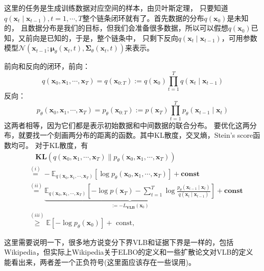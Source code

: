 这里的任务是生成训练数据对应空间的样本，由贝叶斯定理，
只要知道$q(\mathbf{x}_t \mid \mathbf{x}_{t-1}), t=1,\cdots, T$整个链条闭环就有了。首先数据的分布$q(\mathbf{x}_0)$是未知的，
且数据分布是我们的目标，但我们会准备很多数据，所以可以假想$q(\mathbf{x}_0)$已知，又前向是已知的，于是，整个链条中，
只剩下反向$q(\mathbf{x}_t \mid \mathbf{x}_{t-1})$，可用参数模型$\mathcal{N}\left(\mathbf{x}_{t-1} ;
 \boldsymbol{\mu}_\theta\left(\mathbf{x}_t, t\right), \boldsymbol{\Sigma}_\theta\left(\mathbf{x}_t, t\right)\right)$来表示。

前向和反向的闭环，前向：
\begin{equation}
q\left(\mathbf{x}_0, \mathbf{x}_1, \cdots, \mathbf{x}_T\right)=q(\mathbf{x}_{0:T}):=q\left(\mathbf{x}_0\right) \prod_{t=1}^T q\left(\mathbf{x}_t \mid \mathbf{x}_{t-1}\right)
\end{equation}
反向：
\begin{equation}
p_\theta\left(\mathbf{x}_0, \mathbf{x}_1, \cdots, \mathbf{x}_T\right)=p_\theta(\mathbf{x}_{0:T}):=p\left(\mathbf{x}_T\right) \prod_{t=1}^T p_\theta\left(\mathbf{x}_{t-1} \mid \mathbf{x}_t\right)
\end{equation}
这两者相等，因为它们都是表示初始数据和中间数据的联合分布。
要优化这两分布，就要找一个刻画两分布的距离的函数。其中KL散度，交叉熵，Stein's score函数均可。
对于KL散度，有
\begin{equation}
\begin{aligned}
& \quad \mathbf{KL}\left(q\left(\mathbf{x}_0, \mathbf{x}_1, \cdots, \mathbf{x}_T\right) \| p_\theta\left(\mathbf{x}_0, \mathbf{x}_1, \cdots, \mathbf{x}_T\right)\right) \\
& \stackrel{(i)}{=}-\mathbb{E}_{q\left(\mathbf{x}_0, \mathbf{x}_1, \cdots, \mathbf{x}_T\right)}\left[\log p_\theta\left(\mathbf{x}_0, \mathbf{x}_1, \cdots, \mathbf{x}_T\right)\right]+\mathbf{const} \\
& \stackrel{(i i)}{=} \underbrace{\mathbb{E}_{q\left(\mathbf{x}_0, \mathbf{x}_1, \cdots, \mathbf{x}_T\right)}\left[-\log p\left(\mathbf{x}_T\right)-\sum_{t=1}^T \log \frac{p_\theta\left(\mathbf{x}_{t-1} \mid \mathbf{x}_t\right)}{q\left(\mathbf{x}_t \mid \mathbf{x}_{t-1}\right)}\right]}_{:=-L_{\mathbf{VLB}}\left(\mathbf{x}_0\right)}+\mathbf{const} \\
& \stackrel{(i i i)}{\geq} \mathbb{E}\left[-\log p_\theta\left(\mathbf{x}_0\right)\right]+\text { const, }
\end{aligned}
\end{equation}

这里需要说明一下，很多地方说变分下界VLB和证据下界是一样的，包括Wikipedia，但实际上Wikipedia关于ELBO的定义和一些扩散论文对VLB的定义
能看出来，两者差一个正负符号(这里面应该存在一些误用)。


